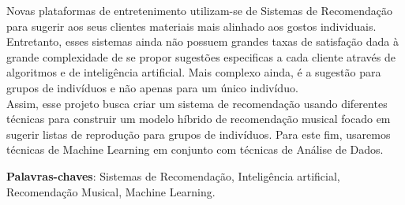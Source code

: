 \documentclass[
	12pt,				%
    oneside,			%
	a4paper,			%
	english,			%
	french,				%
	spanish,			%
	brazil,				%
	]{abntex2}
\begin{document}
\begin{resumo} %

Novas plataformas de entretenimento utilizam-se de Sistemas de Recomendação para sugerir aos seus clientes materiais mais alinhado aos gostos individuais. Entretanto, esses sistemas ainda não possuem grandes taxas de satisfação dada à grande complexidade de se propor sugestões especificas a cada cliente através de algoritmos e de inteligência artificial. Mais complexo ainda, é a sugestão para grupos de indivíduos e não apenas para um único indivíduo.\\
Assim, esse projeto busca criar um sistema de recomendação usando diferentes técnicas para construir um modelo híbrido de recomendação musical focado em sugerir listas de reprodução para grupos de indivíduos. Para este fim, usaremos técnicas de Machine Learning em conjunto com técnicas de Análise de Dados.




 \vspace{\onelineskip}
    
 \noindent
 \textbf{Palavras-chaves}: 
Sistemas de Recomendação, Inteligência artificial, Recomendação Musical, Machine Learning.
\end{resumo} %





\end{document}
